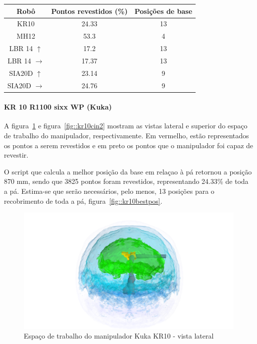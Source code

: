\begin{center}
\begin{tabular}{  c | c | c }
  \hline
  \textbf{Robô} & \textbf{Pontos revestidos (\%)} & \textbf{Posições de base} \\ \hline 
  KR10 & 24.33 & 13\\ \hline 
  MH12 & 53.3 & 4   \\ \hline
  LBR 14 $\uparrow$ & 17.2 & 13 \\ \hline
  LBR 14 $\rightarrow$ & 17.37 & 13 \\ \hline
  SIA20D $\uparrow$ & 23.14 & 9 \\ \hline
  SIA20D $\rightarrow$ & 24.76 & 9 \\ 
  \hline
\end{tabular}
\label{tab::robocin}
\end{center}

\paragraph{KR 10 R1100 sixx WP (Kuka)}
A figura~\ref{fig::kr10cin1} e figura~\ref{fig::kr10cin2} mostram as vistas
lateral e superior do espaço de trabalho do manipulador, respectivamente. Em
vermelho, estão representados os pontos a serem revestidos e em preto os pontos
que o manipulador foi capaz de revestir.

O script que calcula a melhor posição da base em relaçao à pá retornou a posição
870 mm, sendo que 3825 pontos foram revestidos, representando 24.33\% de toda a
pá. Estima-se que serão necessários, pelo menos, 13 posições para o recobrimento
de toda a pá, figura~\ref{fig::kr10bestpos}.



\begin{figure}[h!]	
	\centering
	\includegraphics[width=\columnwidth]{detail/figs/bighatch/kr10_front.png}
	\caption{Espaço de trabalho do manipulador Kuka KR10 - vista lateral}
	\label{fig::kr10cin1}
\end{figure}

